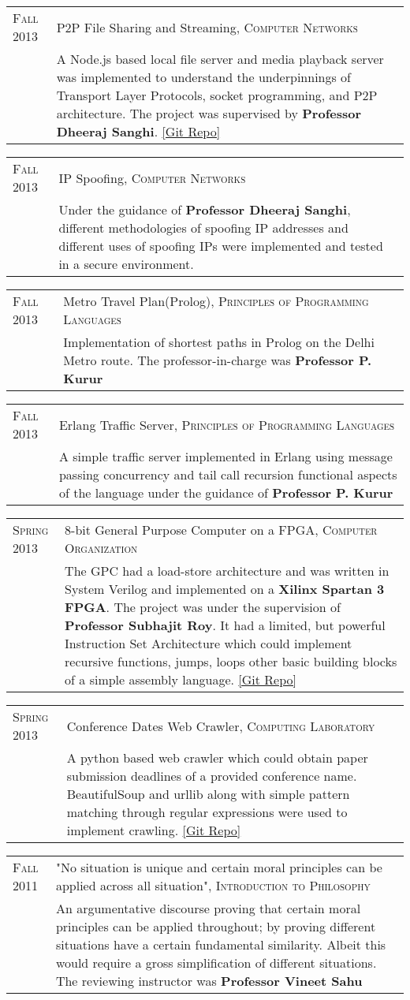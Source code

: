 \documentclass[a4paper,10pt]{article} %
\newcommand{\project}[3]{
    \begin{tabular}{>{\raggedleft}p{2.2cm}|p{17cm}}
        \textsc{#1} & #2 \\
                    & \footnotesize{#3} \\
    \end{tabular}
}
\begin{document}
\project {Fall 2013}
         {P2P File Sharing and Streaming, \textsc{Computer Networks}}
         {A Node.js based local file server and media playback server was implemented
          to understand the underpinnings of Transport Layer Protocols, socket programming,
          and P2P architecture.  The project was supervised by \textbf{Professor Dheeraj Sanghi}.
          \href{https://github.com/srijanshetty/nodesock} {[Git Repo]}}

\project {Fall 2013}
         {IP Spoofing, \textsc{Computer Networks}}
         {Under the guidance of \textbf{Professor Dheeraj Sanghi}, different methodologies
          of spoofing IP addresses and different uses of spoofing IPs were implemented and tested
          in a secure environment.}

\project {Fall 2013}
         {Metro Travel Plan(Prolog), \textsc{Principles of Programming Languages}}
         {Implementation of shortest paths in Prolog on the Delhi Metro route.
          The professor-in-charge was \textbf{Professor P. Kurur}}

\project {Fall 2013}
         {Erlang Traffic Server, \textsc{Principles of Programming Languages}}
         {A simple traffic server implemented in Erlang using message passing
          concurrency and tail call recursion functional aspects of the language under the
          guidance of \textbf{Professor P. Kurur}}

\project {Spring 2013}
         {8-bit General Purpose Computer on a FPGA, \textsc{Computer Organization}}
         {The GPC had a load-store architecture and was written in System Verilog and
          implemented on a \textbf{Xilinx Spartan 3 FPGA}.  The project was under the
          supervision of \textbf{Professor Subhajit Roy}.  It had a limited, but powerful
          Instruction Set Architecture which could implement recursive functions, jumps,
          loops  other basic building blocks of a simple assembly language.
          \href{https://github.com/srijanshetty/220_y11} {[Git Repo]}}

\project {Spring 2013}
         {Conference Dates Web Crawler, \textsc{Computing Laboratory}}
         {A python based web crawler which could obtain paper submission
          deadlines of a provided conference name.  BeautifulSoup and urllib along
          with simple pattern matching through regular expressions were used to implement crawling.
          \href{https://github.com/srijanshetty/crawler} {[Git Repo]}}

\project {Fall 2011}
         {"No situation is unique and certain moral principles can be applied across all situation",
          \textsc{Introduction to Philosophy}}
         {An argumentative discourse proving that certain moral principles
          can be applied throughout; by proving different situations have a certain
          fundamental similarity.  Albeit this would require a gross simplification of
          different situations.  The reviewing instructor was \textbf{Professor Vineet Sahu}}
\end{document}
